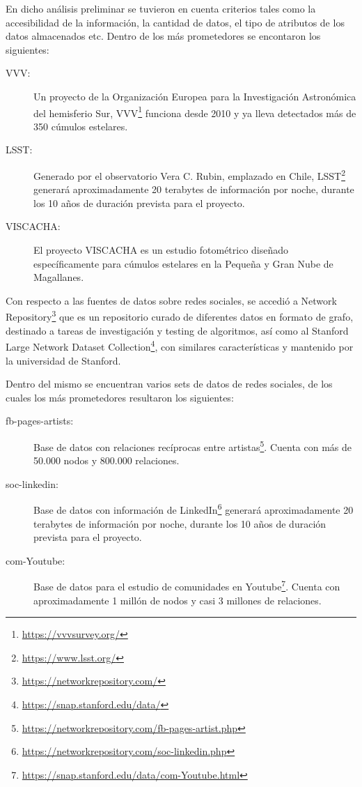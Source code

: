 \documentclass[
	11pt,oneside,a4paper,
	fleqn,
	article
]{memoir}
\begin{document}
En dicho análisis preliminar se tuvieron en cuenta criterios tales como la accesibilidad de la información, la cantidad de datos, el tipo de atributos de los datos almacenados etc. Dentro de los más prometedores se encontaron los siguientes:


\begin{description}
	\item[VVV:] Un proyecto de la Organización Europea para la Investigación Astronómica del hemisferio Sur, VVV\footnote{\href{https://vvvsurvey.org/}{https://vvvsurvey.org/}} funciona desde 2010 y ya lleva detectados más de 350 cúmulos estelares\cite{borissova2011new}.
	\item[LSST:] Generado por el observatorio Vera C. Rubin, emplazado en Chile, LSST\footnote{\href{https://www.lsst.org/}{https://www.lsst.org/}} generará aproximadamente 20 terabytes de información por noche, durante los 10 años de duración prevista para el proyecto\cite{tyson2002large,juric2015lsst}.
	\item[VISCACHA:] El proyecto VISCACHA es un estudio fotométrico diseñado específicamente para cúmulos estelares en la Pequeña y Gran Nube de Magallanes\cite{maia2019viscacha}.
\end{description}

Con respecto a las fuentes de datos sobre redes sociales, se accedió a Network Repository\footnote{\href{https://networkrepository.com/}{https://networkrepository.com/}} que es un repositorio curado de diferentes datos en formato de grafo, destinado a tareas de investigación y testing de algoritmos\cite{nr}, así como al Stanford Large Network Dataset Collection\footnote{\href{https://snap.stanford.edu/data/}{https://snap.stanford.edu/data/}}, con similares características y mantenido por la universidad de Stanford.

Dentro del mismo se encuentran varios sets de datos de redes sociales, de los cuales los más prometedores resultaron los siguientes:

\begin{description}
	\item[fb-pages-artists:] Base de datos con relaciones recíprocas entre artistas\footnote{\href{https://networkrepository.com/fb-pages-artist.php}{https://networkrepository.com/fb-pages-artist.php}}. Cuenta con más de 50.000 nodos y 800.000 relaciones.
	\item[soc-linkedin:] Base de datos con información de LinkedIn\footnote{\href{https://networkrepository.com/soc-linkedin.php}{https://networkrepository.com/soc-linkedin.php}} generará aproximadamente 20 terabytes de información por noche, durante los 10 años de duración prevista para el proyecto.
	\item[com-Youtube:] Base de datos para el estudio de comunidades en Youtube\footnote{\href{https://snap.stanford.edu/data/com-Youtube.html}{https://snap.stanford.edu/data/com-Youtube.html}}. Cuenta con aproximadamente 1 millón de nodos y casi 3 millones de relaciones\cite{yang2012defining}.
\end{description}
\end{document}
